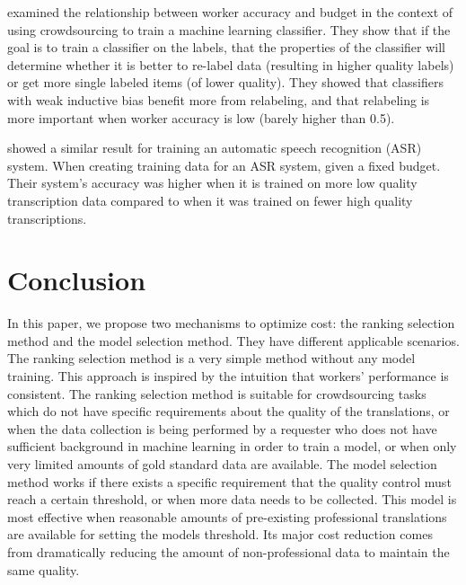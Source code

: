 \documentclass[11pt,letterpaper]{article}
\begin{document}
 examined the relationship between worker accuracy and budget in the context of using crowdsourcing to train a machine learning classifier.  They show that if the goal is to train a classifier on the labels, that the properties of the classifier will determine whether it is better to re-label data (resulting in higher quality labels) or get more single labeled items (of lower quality). They showed that classifiers with weak inductive bias  benefit more from relabeling, and that relabeling is more important when worker accuracy is low (barely higher than 0.5). 

 showed a similar result for training an automatic speech recognition (ASR) system.  When creating training data for an ASR system, given a fixed budget. Their system's accuracy was higher when it is trained on more low quality transcription data compared to when it was trained on fewer high quality transcriptions.


\section{Conclusion}
In this paper, we propose two mechanisms to optimize cost: the ranking selection method and the model selection method. They have  different applicable scenarios. The ranking selection method is a very simple method without any model training. This approach is inspired by the intuition that workers' performance is consistent. The ranking selection method is suitable for crowdsourcing tasks which do not have specific requirements about the quality of the translations, or when the data collection is being performed by a requester who does not have sufficient background in machine learning in order to train a model, or when only very limited amounts of gold standard data are available.
The model selection method works if there exists a specific requirement that the quality control must reach a certain threshold, or when more data needs to be collected.  This model is most effective when reasonable amounts of pre-existing professional translations are available for setting the models threshold.  Its major cost reduction comes from dramatically reducing the amount of non-professional data to maintain the same quality.
\end{document}
